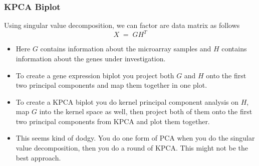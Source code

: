 \documentclass{beamer}
\begin{document}
                         \begin{frame}[t]
                           \frametitle{KPCA Biplot}
                           Using singular value decomposition, we can factor
                           are data matrix as follows
                           \begin{displaymath}
                             X\;=\;GH^{T}
                           \end{displaymath}
                           
                           \begin{itemize}
                           \item
                             Here $G$ contains information about the microarray
                             samples and $H$ contains information about the genes
                             under investigation.
                           \item
                             To create a gene expression biplot you project
                             both $G$ and $H$ onto the first two principal
                             components and map them together in one plot.
                           \item
                             To create a KPCA biplot you do kernel principal
                             component analysis on $H$, map $G$ into the kernel
                             space as well, then project both of them onto the 
                             first two principal components from KPCA and plot 
                             them together.
                           \item
                             This seems kind of dodgy. You do one form of PCA
                             when you do the singular value decomposition, then
                             you do a round of KPCA. This might not be the best
                             approach.
                           \end{itemize}
                         \end{frame}
                           
                           



                         
\end{document}
